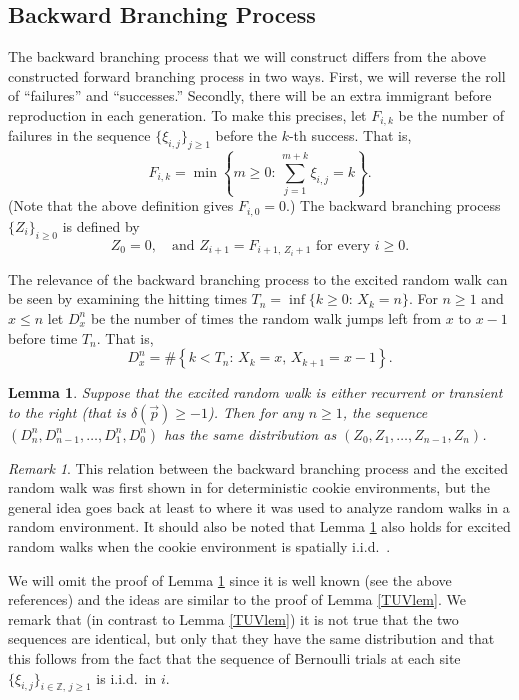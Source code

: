 \documentclass[reqno,letterpaper,11pt]{amsart}
\newtheorem{lem}[thm]{Lemma}
\theoremstyle{remark}
\newtheorem{rem}[thm]{Remark}
\theoremstyle{definition}
\begin{document}
\subsection{Backward Branching Process}

The backward branching process that we will construct differs from the above constructed forward branching process in two ways. First, we will reverse the roll of ``failures'' and ``successes.'' Secondly, there will be an extra immigrant before reproduction in each generation. To make this precises, let $F_{i,k}$ be the number of failures in the sequence $\{\xi_{i,j} \}_{j\geq 1}$ before the $k$-th success. That is, 
\[
 F_{i,k} = \min\left\{ m \geq 0: \, \sum_{j=1}^{m+k} \xi_{i,j} = k \right\}.
\]
(Note that the above definition gives $F_{i,0} = 0$.)
The backward branching process $\{Z_i\}_{i\geq 0}$ is defined by 
\[
 Z_0 = 0, \quad \text{and } Z_{i+1} = F_{i+1, \, Z_i + 1} \text{ for every } i \geq 0. 
\]

The relevance of the backward branching process to the excited random walk can be seen by examining the hitting times $T_n = \inf \{ k\geq 0: \, X_k = n \}$. 
For $n\geq 1$ and $x \leq n$ let $D_x^n$ be the number of times the random walk jumps left from $x$ to $x-1$ before time $T_n$. That is, 
\[
 D_x^n = \# \left\{ k < T_n : \, X_k = x, \, X_{k+1} = x-1 \right\}. 
\]
\begin{lem}\label{ZDlem}
 Suppose that the excited random walk is either recurrent or transient to the right (that is ${\delta}({\vec{p}}) \geq - 1$). Then for any $n\geq 1$, the sequence $(D_n^n,D_{n-1}^n,\ldots, D_1^n, D_0^n)$ has the same distribution as $(Z_0,Z_1,\ldots, Z_{n-1}, Z_n)$. 
\end{lem}
\begin{rem}
 This relation between the backward branching process and the excited random walk was first shown in \cite{bsCRWspeed} for deterministic cookie environments, but the general idea goes back at least to \cite{kksStable} where it was used to analyze random walks in a random environment. It should also be noted that Lemma \ref{ZDlem} also holds for excited random walks when the cookie environment is spatially i.i.d.\ \cite{kzPNERW}.
\end{rem}

We will omit the proof of Lemma \ref{ZDlem} since it is well known (see the above references) and the ideas are similar to the proof of Lemma \ref{TUVlem}. We remark that (in contrast to Lemma \ref{TUVlem}) it is not true that the two sequences are identical, but only that they have the same distribution and that this follows from the fact that the sequence of Bernoulli trials at each site $\{\xi_{i,j}\}_{i\in{\mathbb Z}, \, j\geq 1}$ is i.i.d.\ in $i$. 
\end{document}
